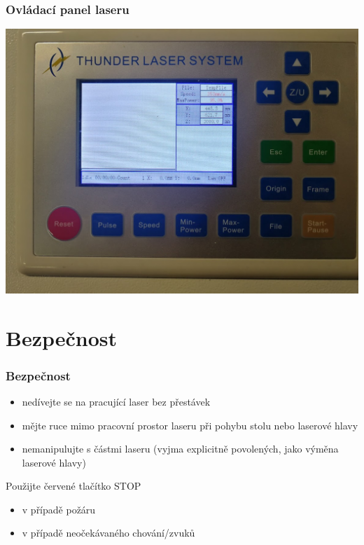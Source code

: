 \documentclass[14pt]{beamer}
\begin{document}
\begin{frame}
\frametitle{Ovládací panel laseru}

\centering
\includegraphics[scale=0.2]{imgs/laser_cp.jpg}


\end{frame}


\section{Bezpečnost}
\begin{frame}
\frametitle{Bezpečnost}

\begin{itemize}
	\item nedívejte se na pracující laser bez přestávek
	\item mějte ruce mimo pracovní prostor laseru při pohybu stolu nebo laserové hlavy
	\item nemanipulujte s částmi laseru (vyjma explicitně povolených, jako výměna laserové hlavy)
\end{itemize}

\begin{alertblock}{Použijte červené tlačítko STOP}
	\begin{itemize}
		\item v případě požáru
		\item v případě neočekávaného chování/zvuků
	\end{itemize}
\end{alertblock}

\end{frame}
\end{document}
